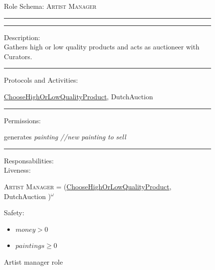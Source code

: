 \documentclass[a4paper,11pt]{report}
\begin{document}
  \begin{figure}[ht!]
    \begin{mdframed}
      Role Schema: \textsc{Artist Manager} \\ \hrule \vspace{2pt} \hrule \vspace{10pt}
      Description:\\
      Gathers high or low quality products and acts as auctioneer with Curators.
      \\ \hrule \vspace{10pt}
      Protocols and Activities:
      \vspace{-10pt}
      \begin{flushleft}
       \underline{ChooseHighOrLowQualityProduct}, 
       DutchAuction 
      \end{flushleft}
      \hrule \vspace{10pt}
      Permissions:\\
      \vspace{-10pt}
      \begin{center}
       generates \textit{painting //new painting to sell}
      \end{center}
      \hrule \vspace{10pt}
      Responsabilities:\\
      Liveness:
      \vspace{-10pt}
      \begin{flushleft}
      \small\textsc{Artist Manager} = (\underline{ChooseHighOrLowQualityProduct}, 
      DutchAuction 
      )$^\omega$
      \end{flushleft}
      Safety:
      \vspace{-10pt}
      \begin{itemize}
      \itemsep0em
       \item $money > 0$
       \item $paintings \geq 0$
      \end{itemize}
    \end{mdframed}
  \caption{Artist manager role}
  \label{figure:role_artist_manager}
  \end{figure}
  
\end{document}
